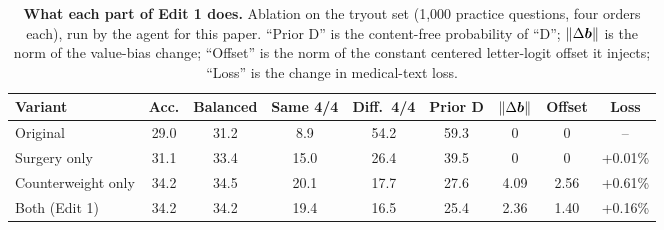 \begin{table}[t]
\centering\small
\caption{\textbf{What each part of Edit 1 does.} Ablation on the tryout set (1{,}000 practice questions, four orders each), run by the agent for this paper. ``Prior D'' is the content-free probability of ``D''; $\|\Delta\boldsymbol{b}\|$ is the norm of the value-bias change; ``Offset'' is the norm of the constant centered letter-logit offset it injects; ``Loss'' is the change in medical-text loss.}
\label{tab:ablation}
\begin{tabular}{lcccccccc}
\toprule
Variant & Acc. & Balanced & Same 4/4 & Diff.\ 4/4 & Prior D & $\|\Delta\boldsymbol{b}\|$ & Offset & Loss \\
\midrule
Original & 29.0 & 31.2 & 8.9 & 54.2 & 59.3 & 0 & 0 & -- \\
Surgery only & 31.1 & 33.4 & 15.0 & 26.4 & 39.5 & 0 & 0 & +0.01\% \\
Counterweight only & 34.2 & 34.5 & 20.1 & 17.7 & 27.6 & 4.09 & 2.56 & +0.61\% \\
Both (Edit 1) & 34.2 & 34.2 & 19.4 & 16.5 & 25.4 & 2.36 & 1.40 & +0.16\% \\
\bottomrule
\end{tabular}
\end{table}
